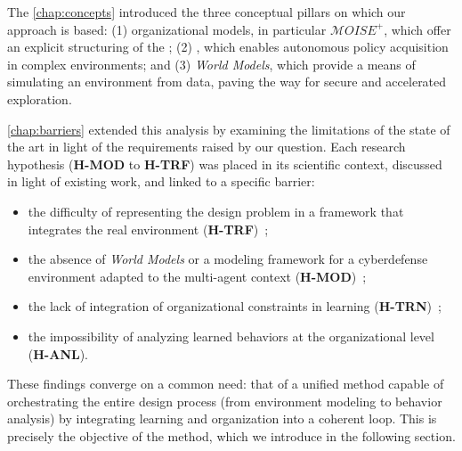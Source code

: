         \medskip

        \noindent
        The \autoref{chap:concepts} introduced the three conceptual pillars on which our approach is based: (1) organizational models, in particular \textit{$\mathcal{M}OISE^+$}, which offer an explicit structuring of the ; (2) , which enables autonomous policy acquisition in complex environments; and (3) \textit{World Models}, which provide a means of simulating an environment from data, paving the way for secure and accelerated exploration.

        \noindent
        \autoref{chap:barriers} extended this analysis by examining the limitations of the state of the art in light of the requirements raised by our question. Each research hypothesis (\textbf{H-MOD} to \textbf{H-TRF}) was placed in its scientific context, discussed in light of existing work, and linked to a specific barrier:
        \begin {itemize}
  \item the difficulty of representing the design problem in a framework that integrates the real environment (\textbf{H-TRF})~;
  \item the absence of \textit{World Models} or a modeling framework for a cyberdefense environment adapted to the multi-agent context (\textbf{H-MOD})~;
  \item the lack of integration of organizational constraints in learning (\textbf{H-TRN})~;
  \item the impossibility of analyzing learned behaviors at the organizational level (\textbf{H-ANL}).
\end{itemize}

\medskip

\noindent
These findings converge on a common need: that of a unified method capable of orchestrating the entire design process (from environment modeling to behavior analysis) by integrating learning and organization into a coherent loop. This is precisely the objective of the  method, which we introduce in the following section.

